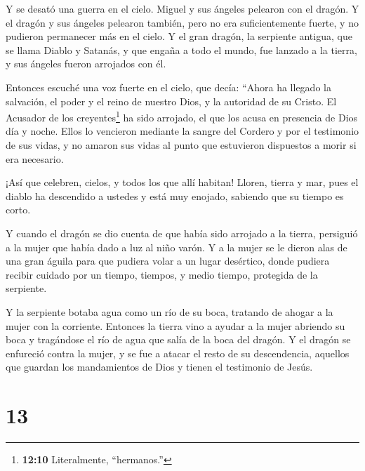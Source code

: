  Y se desató una guerra en el cielo. Miguel y sus ángeles
pelearon con el dragón. Y el dragón y sus ángeles pelearon también,
 pero no era suficientemente fuerte, y no pudieron
permanecer más en el cielo.  Y el gran dragón, la serpiente
antigua, que se llama Diablo y Satanás, y que engaña a todo el mundo,
fue lanzado a la tierra, y sus ángeles fueron arrojados con él.

 Entonces escuché una voz fuerte en el cielo, que decía:
``Ahora ha llegado la salvación, el poder y el reino de nuestro Dios, y
la autoridad de su Cristo. El Acusador de los creyentes\footnote{\textbf{12:10}
  Literalmente, ``hermanos.''} ha sido arrojado, el que los acusa en
presencia de Dios día y noche.  Ellos lo vencieron mediante
la sangre del Cordero y por el testimonio de sus vidas, y no amaron sus
vidas al punto que estuvieron dispuestos a morir si era necesario.

 ¡Así que celebren, cielos, y todos los que allí habitan!
Lloren, tierra y mar, pues el diablo ha descendido a ustedes y está muy
enojado, sabiendo que su tiempo es corto.

 Y cuando el dragón se dio cuenta de que había sido
arrojado a la tierra, persiguió a la mujer que había dado a luz al niño
varón.  Y a la mujer se le dieron alas de una gran águila
para que pudiera volar a un lugar desértico, donde pudiera recibir
cuidado por un tiempo, tiempos, y medio tiempo, protegida de la
serpiente.

 Y la serpiente botaba agua como un río de su boca,
tratando de ahogar a la mujer con la corriente.  Entonces
la tierra vino a ayudar a la mujer abriendo su boca y tragándose el río
de agua que salía de la boca del dragón.  Y el dragón se
enfureció contra la mujer, y se fue a atacar el resto de su
descendencia, aquellos que guardan los mandamientos de Dios y tienen el
testimonio de Jesús.

\hypertarget{section-12}{%
\section{13}\label{section-12}}

